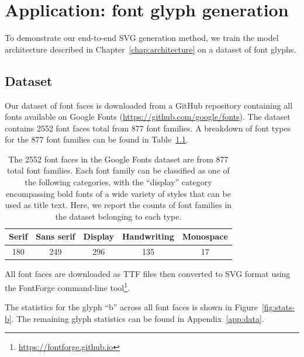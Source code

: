 \chapter{Application: font glyph generation}\label{chap:training}
To demonstrate our end-to-end SVG generation method, we train the model architecture described in Chapter~\ref{chap:architecture} on a dataset of font glyphs.

\section{Dataset}\label{sec:font-data}
Our dataset of font faces is downloaded from a GitHub repository containing all fonts available on Google Fonts (\url{https://github.com/google/fonts}).
The dataset contains 2552 font faces total from 877 font families.
A breakdown of font types for the 877 font families can be found in Table~\ref{tbl:fonttypes}.

\begin{table}[h]
\centering
\caption[A breakdown of font types in the Google Fonts dataset]
    {The 2552 font faces in the Google Fonts dataset are from 877 total font families.
    Each font family can be classified as one of the following categories, with the ``display'' category encompassing bold fonts of a wide variety of styles that can be used as title text.
    Here, we report the counts of font families in the dataset belonging to each type.\label{tbl:fonttypes}}
\begin{tabular}{c c c c c}
\toprule
    Serif & Sans serif & Display & Handwriting & Monospace \\ \midrule
    180 & 249 & 296 & 135 & 17
\end{tabular}
\end{table}

All font faces are downloaded as TTF files then converted to SVG format using the FontForge command-line tool\footnote{\url{https://fontforge.github.io}}.

The statistics for the glyph ``b'' across all font faces is shown in Figure~\ref{fig:stats-b}.
The remaining glyph statistics can be found in Appendix~\ref{app:data}.

